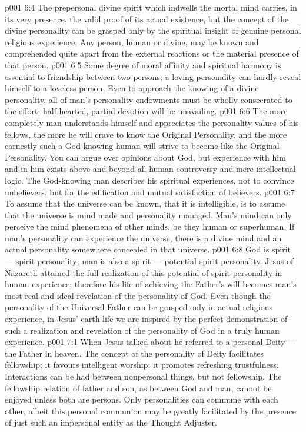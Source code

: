 \vs p001 6:4 \pc The prepersonal divine spirit which indwells the mortal mind carries, in its very presence, the valid proof of its actual existence, but the concept of the divine personality can be grasped only by the spiritual insight of genuine personal religious experience. Any person, human or divine, may be known and comprehended quite apart from the external reactions or the material presence of that person.
\vs p001 6:5 Some degree of moral affinity and spiritual harmony is essential to friendship between two persons; a loving personality can hardly reveal himself to a loveless person. Even to approach the knowing of a divine personality, all of man’s personality endowments must be wholly consecrated to the effort; half\hyp{}hearted, partial devotion will be unavailing.
\vs p001 6:6 The more completely man understands himself and appreciates the personality values of his fellows, the more he will crave to know the Original Personality, and the more earnestly such a God\hyp{}knowing human will strive to become like the Original Personality. You can argue over opinions about God, but experience with him and in him exists above and beyond all human controversy and mere intellectual logic. The God\hyp{}knowing man describes his spiritual experiences, not to convince unbelievers, but for the edification and mutual satisfaction of believers.
\vs p001 6:7 \pc To assume that the universe can be known, that it is intelligible, is to assume that the universe is mind made and personality managed. Man’s mind can only perceive the mind phenomena of other minds, be they human or superhuman. If man’s personality can experience the universe, there is a divine mind and an actual personality somewhere concealed in that universe.
\vs p001 6:8 \pc God is spirit --- spirit personality; man is also a spirit --- potential spirit personality. Jesus of Nazareth attained the full realization of this potential of spirit personality in human experience; therefore his life of achieving the Father’s will becomes man’s most real and ideal revelation of the personality of God. Even though the personality of the Universal Father can be grasped only in actual religious experience, in Jesus’ earth life we are inspired by the perfect demonstration of such a realization and revelation of the personality of God in a truly human experience.
\vs p001 7:1 When Jesus talked about  he referred to a personal Deity --- the Father in heaven. The concept of the personality of Deity facilitates fellowship; it favours intelligent worship; it promotes refreshing trustfulness. Interactions can be had between nonpersonal things, but not fellowship. The fellowship relation of father and son, as between God and man, cannot be enjoyed unless both are persons. Only personalities can commune with each other, albeit this personal communion may be greatly facilitated by the presence of just such an impersonal entity as the Thought Adjuster.
